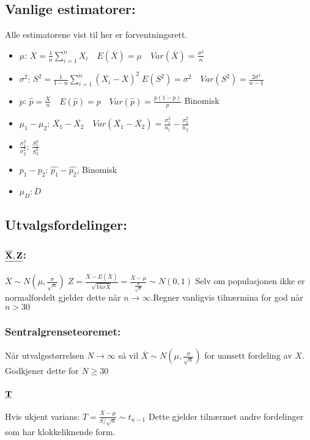 \documentclass[12pt,a4paper,twocolumn,twoside]{article}
\def\forvar#1#2#3{E(#1)=#2 \quad Var(#1)=#3}
\begin{document}
\subsection*{Vanlige estimatorer:}
Alle estimatorene vist til her er forventningsrett.
\begin{itemize}[topsep=0pt,itemsep=0pt, partopsep=0pt]
    \item $\mu$: $\overline{X}=\frac{1}{n}\sum_{i=1}^n X_i \quad \forvar{\overline{X}}{\mu}{\frac{\sigma^2}{n}}$
    \item $\sigma^2$: $S^2=\frac{1}{1-n}\sum_{i=1}^n(X_i-\overline{X})^2 \; \forvar{S^2}{\sigma^2}{\frac{2\sigma^4}{n-1}}$
    \item $p$: $\hat{p}=\frac{X}{n} \quad \forvar{\hat{p}}{p}{\frac{p(1-p)}{p}}$ Binomisk
    \item $\mu_1-\mu_2$: $\overline{X_1}-\overline{X_2} \quad Var(\overline{X_1}-\overline{X_2})=\frac{\sigma^2_1}{n_1}-\frac{\sigma^2_2}{n_2}$
    \item $\frac{\sigma^2_1}{\sigma^2_2}$: $\frac{S^2_1}{S^2_2}$
    \item $p_1-p_2$: $\hat{p_1}-\hat{p_2}$, Binomisk
    \item $\mu_D: \overline{D}$
\end{itemize}
%
%
\subsection*{Utvalgsfordelinger:}
\subsubsection*{$\bold{\underline{\overline{X},Z}}$:}
$\overline{X}\sim N\left(\mu,\frac{\sigma}{\sqrt{n}}\right)\; Z=\frac{\overline{X}-E(\overline{X})}{\sqrt{Var{\overline{X}}}}=\frac{\overline{X}-\mu}{\frac{\sigma}{\sqrt{n}}}\sim N(0,1)$
Selv om populasjonen ikke er normalfordelt gjelder dette når $n\to\infty$.Regner vanligvis tilnærmina for god når $n>30$
\subsubsection*{Sentralgrenseteoremet:}
Når utvalgsstørrelsen $N\to\infty$ så vil $\overline{X}\sim N\left(\mu,\frac{\sigma}{\sqrt{n}}\right)$ for uansett fordeling av $X$. Godkjener dette for $N\geq 30$
\subsubsection*{$\bold{\underline{T}}$}
Hvis ukjent varians:
$T=\frac{\overline{X}-\mu}{S/\sqrt{n}}\sim t_{n-1}$
Dette gjelder tilnærmet andre fordelinger som har klokkeliknende form.
\end{document}

